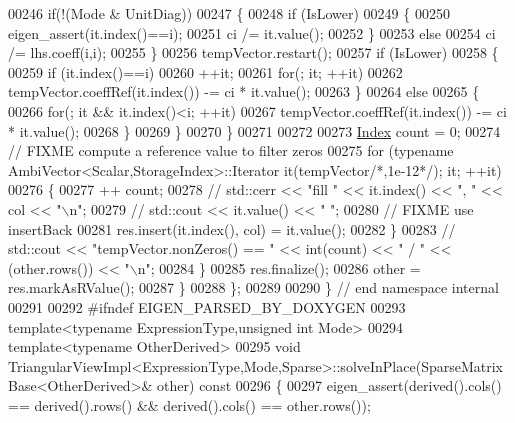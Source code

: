 \begin{DoxyCode}
00246           \textcolor{keywordflow}{if}(!(Mode & UnitDiag))
00247           \{
00248             \textcolor{keywordflow}{if} (IsLower)
00249             \{
00250               eigen\_assert(it.index()==i);
00251               ci /= it.value();
00252             \}
00253             \textcolor{keywordflow}{else}
00254               ci /= lhs.coeff(i,i);
00255           \}
00256           tempVector.restart();
00257           \textcolor{keywordflow}{if} (IsLower)
00258           \{
00259             \textcolor{keywordflow}{if} (it.index()==i)
00260               ++it;
00261             \textcolor{keywordflow}{for}(; it; ++it)
00262               tempVector.coeffRef(it.index()) -= ci * it.value();
00263           \}
00264           \textcolor{keywordflow}{else}
00265           \{
00266             \textcolor{keywordflow}{for}(; it && it.index()<i; ++it)
00267               tempVector.coeffRef(it.index()) -= ci * it.value();
00268           \}
00269         \}
00270       \}
00271 
00272 
00273       \hyperlink{namespace_eigen_a62e77e0933482dafde8fe197d9a2cfde}{Index} count = 0;
00274       \textcolor{comment}{// FIXME compute a reference value to filter zeros}
00275       \textcolor{keywordflow}{for} (\textcolor{keyword}{typename} AmbiVector<Scalar,StorageIndex>::Iterator it(tempVector\textcolor{comment}{/*,1e-12*/}); it; ++it)
00276       \{
00277         ++ count;
00278 \textcolor{comment}{//         std::cerr << "fill " << it.index() << ", " << col << "\(\backslash\)n";}
00279 \textcolor{comment}{//         std::cout << it.value() << "  ";}
00280         \textcolor{comment}{// FIXME use insertBack}
00281         res.insert(it.index(), col) = it.value();
00282       \}
00283 \textcolor{comment}{//       std::cout << "tempVector.nonZeros() == " << int(count) << " / " << (other.rows()) << "\(\backslash\)n";}
00284     \}
00285     res.finalize();
00286     other = res.markAsRValue();
00287   \}
00288 \};
00289 
00290 \} \textcolor{comment}{// end namespace internal}
00291 
00292 \textcolor{preprocessor}{#ifndef EIGEN\_PARSED\_BY\_DOXYGEN}
00293 \textcolor{keyword}{template}<\textcolor{keyword}{typename} ExpressionType,\textcolor{keywordtype}{unsigned} \textcolor{keywordtype}{int} Mode>
00294 \textcolor{keyword}{template}<\textcolor{keyword}{typename} OtherDerived>
00295 \textcolor{keywordtype}{void} TriangularViewImpl<ExpressionType,Mode,Sparse>::solveInPlace(SparseMatrixBase<OtherDerived>& other)\textcolor{keyword}{
       const}
00296 \textcolor{keyword}{}\{
00297   eigen\_assert(derived().cols() == derived().rows() && derived().cols() == other.rows());

\end{DoxyCode}

